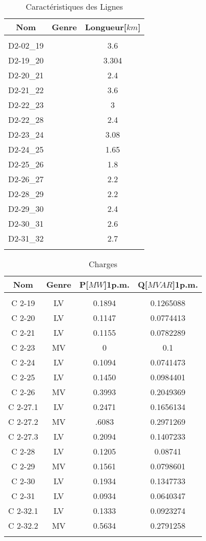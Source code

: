 \begin{table}[H]
	\captionsetup{justification=centering,margin=2cm}
	\caption{Caractéristiques des Lignes}
	\centering
	\begin{tabular}{ccc}
		\hline
		Nom&Genre&Longueur[$ km $]\\
		\hline\\
		D2-02\_19&\cablei&3.6\\
		D2-19\_20	&\cablei&3.304\\
		D2-20\_21	&\cableiii&2.4\\
		D2-21\_22	&\cableiii&3.6\\
		D2-22\_23	&\cableiii&3\\
		D2-22\_28	&\cableii&2.4\\
		D2-23\_24	&\cableiii&3.08\\
		D2-24\_25	&\cableiii&1.65\\
		D2-25\_26	&\cableiii&1.8\\
		D2-26\_27	&\cableiii&2.2\\
		D2-28\_29	&\cableii&2.2\\
		D2-29\_30	&\cableii&2.4\\
		D2-30\_31	&\cableii&2.6\\
		D2-31\_32	&\cableii&2.7\\
		\hline\\
	\end{tabular}
\end{table}	

\begin{table}[H]
	\captionsetup{justification=centering,margin=2cm}
	\caption{Charges}
	\centering
	\begin{tabular}{cccc}
		\hline
		Nom&Genre&P[$ MW $]1p.m.&Q[$MVAR$]1p.m.\\
		\hline\\
		C 2-19 &LV&0.1894&0.1265088\\
		C 2-20 &LV&0.1147&0.0774413\\
		C 2-21 &LV&0.1155&0.0782289\\
		C 2-23&MV&0&0.1\\
		C 2-24 &LV&0.1094&0.0741473\\
		C 2-25 &LV&0.1450&0.0984401\\
		C 2-26&MV&0.3993&0.2049369\\
		C 2-27.1&LV&0.2471&0.1656134\\
		C 2-27.2& MV&.6083&0.2971269\\
		C 2-27.3& LV&0.2094&0.1407233\\
		C 2-28 &LV&0.1205&0.08741\\
		C 2-29 &MV&0.1561&0.0798601\\
		C 2-30 &LV&0.1934&0.1347733\\
		C 2-31 &LV&0.0934&0.0640347\\
		C 2-32.1 &LV&0.1333&0.0923274\\
		C 2-32.2 &MV&0.5634&0.2791258\\
		\hline\\
	\end{tabular}
\end{table}	
